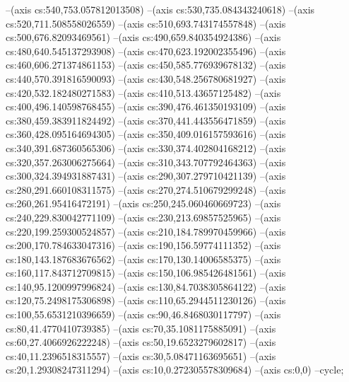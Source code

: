 --(axis cs:540,753.057812013508)
--(axis cs:530,735.084343240618)
--(axis cs:520,711.508558026559)
--(axis cs:510,693.743174557848)
--(axis cs:500,676.82093469561)
--(axis cs:490,659.840354924386)
--(axis cs:480,640.545137293908)
--(axis cs:470,623.192002355496)
--(axis cs:460,606.271374861153)
--(axis cs:450,585.776939678132)
--(axis cs:440,570.391816590093)
--(axis cs:430,548.256780681927)
--(axis cs:420,532.182480271583)
--(axis cs:410,513.43657125482)
--(axis cs:400,496.140598768455)
--(axis cs:390,476.461350193109)
--(axis cs:380,459.383911824492)
--(axis cs:370,441.443556471859)
--(axis cs:360,428.095164694305)
--(axis cs:350,409.016157593616)
--(axis cs:340,391.687360565306)
--(axis cs:330,374.402804168212)
--(axis cs:320,357.263006275664)
--(axis cs:310,343.707792464363)
--(axis cs:300,324.394931887431)
--(axis cs:290,307.279710421139)
--(axis cs:280,291.660108311575)
--(axis cs:270,274.510679299248)
--(axis cs:260,261.95416472191)
--(axis cs:250,245.060460669723)
--(axis cs:240,229.830042771109)
--(axis cs:230,213.69857525965)
--(axis cs:220,199.259300524857)
--(axis cs:210,184.789970459966)
--(axis cs:200,170.784633047316)
--(axis cs:190,156.59774111352)
--(axis cs:180,143.187683676562)
--(axis cs:170,130.14006585375)
--(axis cs:160,117.843712709815)
--(axis cs:150,106.985426481561)
--(axis cs:140,95.1200997996824)
--(axis cs:130,84.7038305864122)
--(axis cs:120,75.2498175306898)
--(axis cs:110,65.2944511230126)
--(axis cs:100,55.6531210396659)
--(axis cs:90,46.8468030117797)
--(axis cs:80,41.4770410739385)
--(axis cs:70,35.1081175885091)
--(axis cs:60,27.4066926222248)
--(axis cs:50,19.6523279602817)
--(axis cs:40,11.2396518315557)
--(axis cs:30,5.08471163695651)
--(axis cs:20,1.29308247311294)
--(axis cs:10,0.272305578309684)
--(axis cs:0,0)
--cycle;

